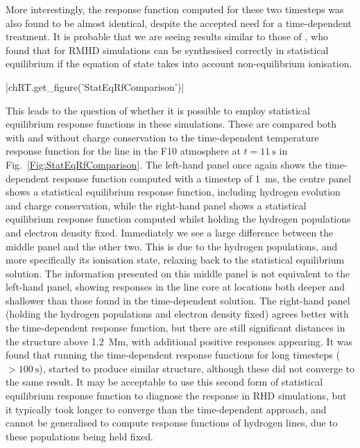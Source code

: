 More interestingly, the \Ha{} response function computed for these two timesteps was also found to be almost identical, despite the accepted need for a time-dependent treatment.
It is probable that we are seeing results similar to those of \citet{Leenaarts2012a}, who found that for RMHD simulations \Ha{} can be synthesised correctly in statistical equilibrium if the equation of state takes into account non-equilibrium ionisation.

\py[TimeDepRT]|chRT.get_figure('StatEqRfComparison')|

This leads to the question of whether it is possible to employ statistical equilibrium response functions in these simulations.
These are compared both with and without charge conservation to the time-dependent temperature response function for the \CaLine{} line in the F10 atmosphere at $t=\SI{11}{\s}$ in Fig.~\ref{Fig:StatEqRfComparison}.
The left-hand panel once again shows the time-dependent response function computed with a timestep of \SI{1}{\milli\s}, the centre panel shows a statistical equilibrium response function, including hydrogen evolution and charge conservation, while the right-hand panel shows a statistical equilibrium response function computed whilst holding the hydrogen populations and electron density fixed.
Immediately we see a large difference between the middle panel and the other two.
This is due to the hydrogen populations, and more specifically its ionisation state, relaxing back to the statistical equilibrium solution.
The information presented on this middle panel is not equivalent to the left-hand panel, showing responses in the line core at locations both deeper and shallower than those found in the time-dependent solution.
The right-hand panel (holding the hydrogen populations and electron density fixed) agrees better with the time-dependent response function, but there are still significant distances in the structure above \SI{1.2}{\mega\metre}, with additional positive responses appearing.
It was found that running the time-dependent response functions for long timesteps ($>\SI{100}{\s}$), started to produce similar structure, although these did not converge to the same result.
It may be acceptable to use this second form of statistical equilibrium response function to diagnose the \CaLine{} response in RHD simulations, but it typically took longer to converge than the time-dependent approach, and cannot be generalised to compute response functions of hydrogen lines, due to these populations being held fixed.

